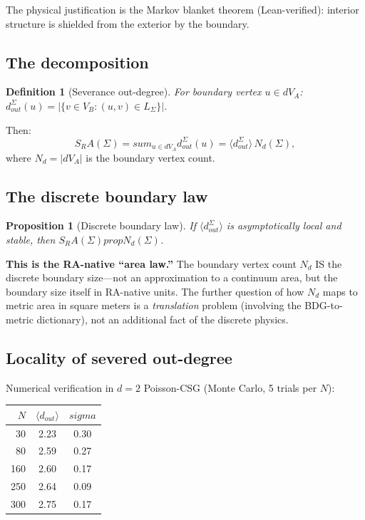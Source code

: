 \documentclass[11pt]{article}
\def\sigma{sigma}%
\def\mathrm#1{#1}%
\def\sum{sum}%
\def\partial{d}%
\def\propto{prop}%
\def\SRa{S_RA}%
\newtheorem{definition}{Definition}
\newtheorem{proposition}{Proposition}
\newcommand{\SRa}{S_{\mathrm{RA}}}
\begin{document}
The physical justification is the Markov blanket theorem (Lean-verified): interior structure is shielded from the exterior by the boundary.

\subsection{The decomposition}

\begin{definition}[Severance out-degree]
For boundary vertex $u\in\partial V_A$: $d_{\mathrm{out}}^\Sigma(u)=|\{v\in V_B:(u,v)\in L_\Sigma\}|$.
\end{definition}

Then:
\begin{equation}
\label{eq:decomposition}
\SRa(\Sigma)=\sum_{u\in\partial V_A}d_{\mathrm{out}}^\Sigma(u) = \langle d_{\mathrm{out}}^\Sigma\rangle\,N_\partial(\Sigma),
\end{equation}
where $N_\partial=|\partial V_A|$ is the boundary vertex count.

\subsection{The discrete boundary law}

\begin{proposition}[Discrete boundary law]
If $\langle d_{\mathrm{out}}^\Sigma\rangle$ is asymptotically local and stable, then $\SRa(\Sigma)\propto N_\partial(\Sigma)$.
\end{proposition}

\textbf{This is the RA-native ``area law.''} The boundary vertex count $N_\partial$ IS the discrete boundary size---not an approximation to a continuum area, but the boundary size itself in RA-native units. The further question of how $N_\partial$ maps to metric area in square meters is a \emph{translation} problem (involving the BDG-to-metric dictionary), not an additional fact of the discrete physics.

\subsection{Locality of severed out-degree}

Numerical verification in $d=2$ Poisson-CSG (Monte Carlo, 5 trials per $N$):

\begin{center}
\begin{tabular}{rcc}
\toprule
$N$ & $\langle d_{\mathrm{out}}\rangle$ & $\sigma$ \\
\midrule
30 & 2.23 & 0.30 \\
80 & 2.59 & 0.27 \\
160 & 2.60 & 0.17 \\
250 & 2.64 & 0.09 \\
300 & 2.75 & 0.17 \\
\bottomrule
\end{tabular}
\end{center}
\end{document}
